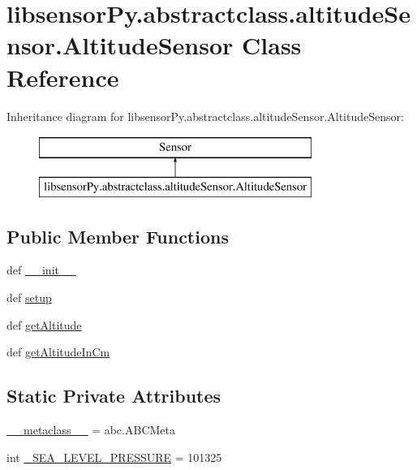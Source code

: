 \hypertarget{classlibsensorPy_1_1abstractclass_1_1altitudeSensor_1_1AltitudeSensor}{}\section{libsensor\+Py.\+abstractclass.\+altitude\+Sensor.\+Altitude\+Sensor Class Reference}
\label{classlibsensorPy_1_1abstractclass_1_1altitudeSensor_1_1AltitudeSensor}
Inheritance diagram for libsensor\+Py.\+abstractclass.\+altitude\+Sensor.\+Altitude\+Sensor\+:\begin{figure}[H]
\begin{center}
\leavevmode
\includegraphics[height=2.000000cm]{classlibsensorPy_1_1abstractclass_1_1altitudeSensor_1_1AltitudeSensor}
\end{center}
\end{figure}
\subsection*{Public Member Functions}
\begin{DoxyCompactItemize}
\item 
def \hyperlink{classlibsensorPy_1_1abstractclass_1_1altitudeSensor_1_1AltitudeSensor_ad5adfa42973cf066c363f5bf32896fa9}{\+\_\+\+\_\+init\+\_\+\+\_\+}
\item 
def \hyperlink{classlibsensorPy_1_1abstractclass_1_1altitudeSensor_1_1AltitudeSensor_a32b056c7b553353ba4bdca9c66af6d4e}{setup}
\item 
def \hyperlink{classlibsensorPy_1_1abstractclass_1_1altitudeSensor_1_1AltitudeSensor_a0f39a35efc888cc569d86794673ab1cc}{get\+Altitude}
\item 
def \hyperlink{classlibsensorPy_1_1abstractclass_1_1altitudeSensor_1_1AltitudeSensor_ae9f8da872690489f26a9c2c872f6ead1}{get\+Altitude\+In\+Cm}
\end{DoxyCompactItemize}
\subsection*{Static Private Attributes}
\begin{DoxyCompactItemize}
\item 
\hyperlink{classlibsensorPy_1_1abstractclass_1_1altitudeSensor_1_1AltitudeSensor_a3ef46a92bff4c78bc74d5dd3216469aa}{\+\_\+\+\_\+metaclass\+\_\+\+\_\+} = abc.\+A\+B\+C\+Meta
\item 
int \hyperlink{classlibsensorPy_1_1abstractclass_1_1altitudeSensor_1_1AltitudeSensor_a08c1128d7b374e74665c3fb56912ac71}{\+\_\+\+S\+E\+A\+\_\+\+L\+E\+V\+E\+L\+\_\+\+P\+R\+E\+S\+S\+U\+R\+E} = 101325
\end{DoxyCompactItemize}


